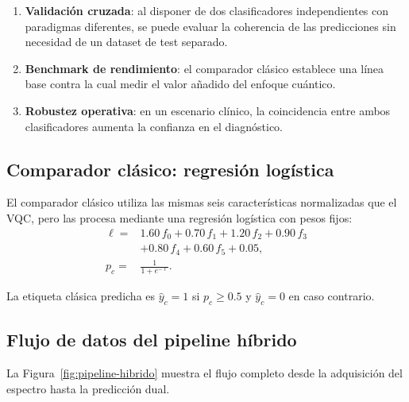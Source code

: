 \documentclass[11pt,a4paper,spanish]{book}
\begin{document}
\begin{enumerate}
	\item \textbf{Validaci\'{o}n cruzada}: al disponer de dos clasificadores independientes con paradigmas diferentes, se puede evaluar la coherencia de las predicciones sin necesidad de un dataset de test separado.
	\item \textbf{Benchmark de rendimiento}: el comparador cl\'{a}sico establece una l\'{i}nea base contra la cual medir el valor a\~{n}adido del enfoque cu\'{a}ntico.
	\item \textbf{Robustez operativa}: en un escenario cl\'{i}nico, la coincidencia entre ambos clasificadores aumenta la confianza en el diagn\'{o}stico.
\end{enumerate}

\subsection{Comparador cl\'{a}sico: regresi\'{o}n log\'{i}stica}

El comparador cl\'{a}sico utiliza las mismas seis caracter\'{i}sticas normalizadas que el VQC, pero las procesa mediante una regresi\'{o}n log\'{i}stica con pesos fijos:
\begin{align}
\ell ={}& 1.60\,f_0 + 0.70\,f_1 + 1.20\,f_2 + 0.90\,f_3 \nonumber \\
& + 0.80\,f_4 + 0.60\,f_5 + 0.05, \label{eq:logit-classical} \\
p_c ={}& \frac{1}{1 + e^{-\ell}}. \label{eq:classical-prob}
\end{align}

La etiqueta cl\'{a}sica predicha es $\hat{y}_c = 1$ si $p_c \geq 0.5$ y $\hat{y}_c = 0$ en caso contrario.

\subsection{Flujo de datos del pipeline h\'{i}brido}

La Figura~\ref{fig:pipeline-hibrido} muestra el flujo completo desde la adquisici\'{o}n del espectro hasta la predicci\'{o}n dual.
\end{document}
